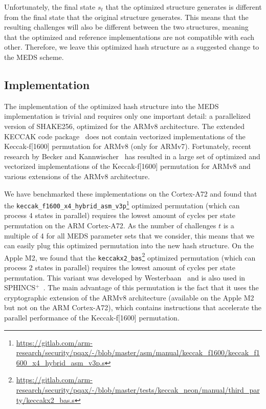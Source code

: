 \documentclass[11pt,a4paper]{report}
\theoremstyle{definition}
\begin{document}
Unfortunately, the final state $s_t$ that the optimized structure generates is different from the final state that the original structure generates. This means that the resulting challenges will also be different between the two structures, meaning that the optimized and reference implementations are not compatible with each other. Therefore, we leave this optimized hash structure as a suggested change to the MEDS scheme.

\subsection{Implementation}
The implementation of the optimized hash structure into the MEDS implementation is trivial and requires only one important detail: a parallelized version of SHAKE256, optimized for the ARMv8 architecture. The extended KECCAK code package~\cite{xkcp} does not contain vectorized implementations of the Keccak-f[1600] permutation for ARMv8 (only for ARMv7). Fortunately, recent research by Becker and Kannwischer~\cite{becker2022hybrid} has resulted in a large set of optimized and vectorized implementations of the Keccak-f[1600] permutation for ARMv8 and various extensions of the ARMv8 architecture.

We have benchmarked these implementations on the Cortex-A72 and found that the \texttt{keccak\_f1600\_x4\_hybrid\_asm\_v3p}\footnote{\url{https://gitlab.com/arm-research/security/pqax/-/blob/master/asm/manual/keccak\_f1600/keccak\_f1600\_x4\_hybrid\_asm\_v3p.s}} optimized permutation (which can process 4 states in parallel) requires the lowest amount of cycles per state permutation on the ARM Cortex-A72. As the number of challenges $t$ is a multiple of 4 for all MEDS parameter sets that we consider, this means that we can easily plug this optimized permutation into the new hash structure. On the Apple M2, we found that the \texttt{keccakx2\_bas}\footnote{\url{https://gitlab.com/arm-research/security/pqax/-/blob/master/tests/keccak\_neon/manual/third\_party/keccakx2\_bas.s}} optimized permutation (which can process 2 states in parallel) requires the lowest amount of cycles per state permutation. This variant was developed by Westerbaan~\cite{westerbaan_armed_keccak} and is also used in SPHINCS$^+$~\cite{aumasson2022sphincs}. The main advantage of this permutation is the fact that it uses the cryptographic extension of the ARMv8 architecture (available on the Apple M2 but not on the ARM Cortex-A72), which contains instructions that accelerate the parallel performance of the Keccak-f[1600] permutation.
\end{document}

